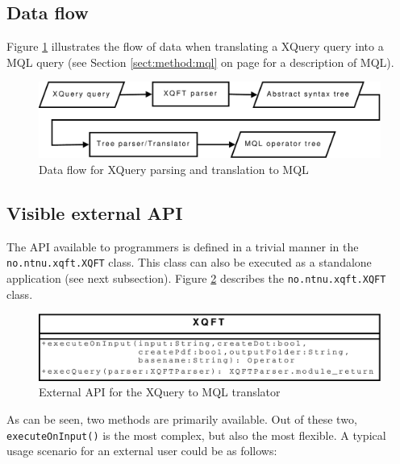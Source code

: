 \subsection{Data flow}
Figure \ref{fig:impl:sys:mql_dataflow} illustrates the flow of data when
translating a XQuery query into a MQL query (see Section \ref{sect:method:mql}
on page \pageref{sect:method:mql} for a description of MQL). 

\begin{figure}[!htp]
\begin{center}
  \includegraphics[scale=0.5]{diagrams/mql_dataflow}
  \caption{Data flow for XQuery parsing and translation to MQL}
  \label{fig:impl:sys:mql_dataflow}
\end{center}
\end{figure}

\subsection{Visible external API}
The API available to programmers is defined in a trivial manner in the
\texttt{no.ntnu.xqft.XQFT} class. This class can also be executed as a
standalone application (see next subsection). Figure
\ref{fig:impl:sys:xqft_extapi_uml} describes the \texttt{no.ntnu.xqft.XQFT}
class.

\begin{figure}[!htp]
\begin{center}
  \includegraphics[scale=0.5]{diagrams/xqft_extapi_uml}
  \caption{External API for the XQuery to MQL translator}
  \label{fig:impl:sys:xqft_extapi_uml}
\end{center}
\end{figure}

As can be seen, two methods are primarily available. Out of these two,
\texttt{executeOnInput()} is the most complex, but also the most flexible. A
typical usage scenario for an external user could be as follows:

